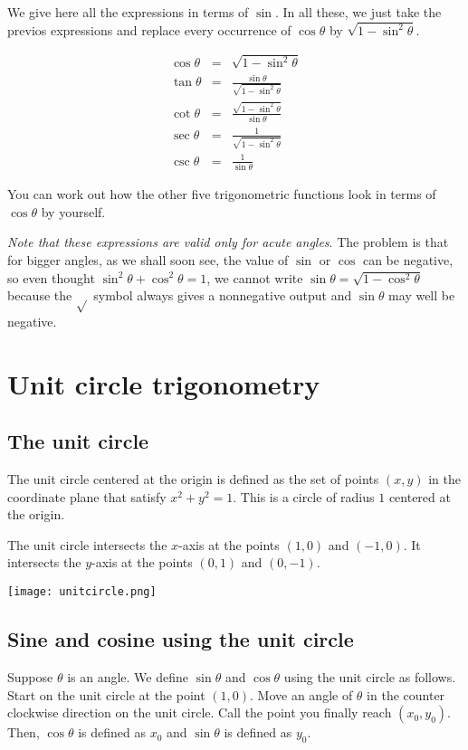 \documentclass{amsart}
\begin{document}
We give here all the expressions in terms of $\sin$. In all these, we
just take the previos expressions and replace every occurrence of
$\cos \theta$ by $\sqrt{1 - \sin^2\theta}$.

\begin{eqnarray*}
  \cos \theta & = & \sqrt{1 - \sin^2\theta}\\
  \tan \theta & = & \frac{\sin \theta}{\sqrt{1 - \sin^2\theta}}\\
  \cot \theta & = & \frac{\sqrt{1 - \sin^2\theta}}{\sin \theta}\\
  \sec \theta & = & \frac{1}{\sqrt{1 - \sin^2 \theta}}\\
  \csc \theta & = & \frac{1}{\sin \theta}
\end{eqnarray*}

You can work out how the other five trigonometric functions look in
terms of $\cos \theta$ by yourself.

{\em Note that these expressions are valid only for acute angles}. The
problem is that for bigger angles, as we shall soon see, the value of
$\sin$ or $\cos$ can be negative, so even thought $\sin^2\theta +
\cos^2\theta = 1$, we cannot write $\sin \theta = \sqrt{1 -
\cos^2\theta}$ because the $\sqrt{}$ symbol always gives a nonnegative
output and $\sin \theta$ may well be negative.

\section{Unit circle trigonometry}

\subsection{The unit circle}

The unit circle centered at the origin is defined as the set of points
$(x,y)$ in the coordinate plane that satisfy $x^2 + y^2 = 1$. This is
a circle of radius $1$ centered at the origin.

The unit circle intersects the $x$-axis at the points $(1,0)$ and
$(-1,0)$. It intersects the $y$-axis at the points $(0,1)$ and
$(0,-1)$.

\texttt{[image: unitcircle.png]}

\subsection{Sine and cosine using the unit circle}

Suppose $\theta$ is an angle. We define $\sin \theta$ and $\cos
\theta$ using the unit circle as follows. Start on the unit circle at
the point $(1,0)$. Move an angle of $\theta$ in the counter clockwise
direction on the unit circle. Call the point you finally reach
$(x_0,y_0)$. Then, $\cos \theta$ is defined as $x_0$ and $\sin \theta$
is defined as $y_0$.
\end{document}
